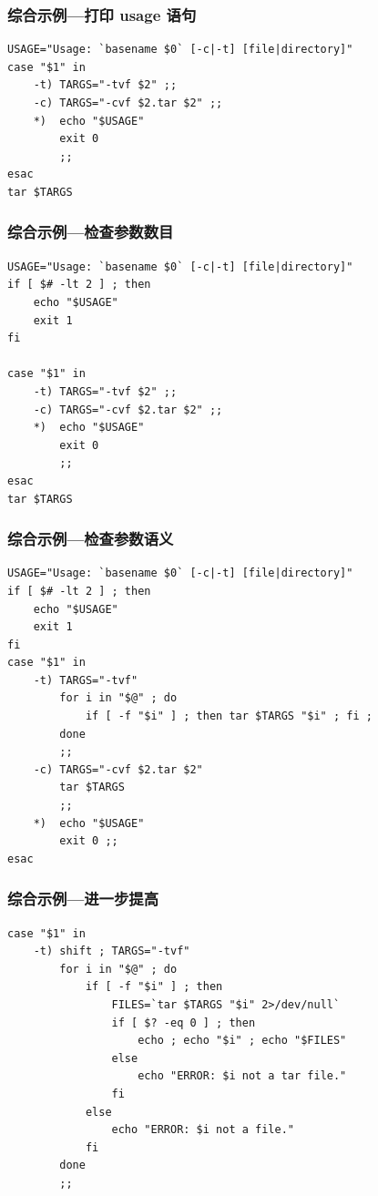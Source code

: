 \documentclass[compress]{beamer}
\begin{document}
\begin{frame}[fragile]
\frametitle{综合示例---打印 usage 语句}

\begin{lstlisting}
USAGE="Usage: `basename $0` [-c|-t] [file|directory]"
case "$1" in
    -t) TARGS="-tvf $2" ;;
    -c) TARGS="-cvf $2.tar $2" ;;
    *)  echo "$USAGE"
        exit 0
        ;;
esac
tar $TARGS
\end{lstlisting}
\end{frame}

\begin{frame}[fragile]
\frametitle{综合示例---检查参数数目}

\begin{lstlisting}
USAGE="Usage: `basename $0` [-c|-t] [file|directory]"
if [ $# -lt 2 ] ; then
    echo "$USAGE"
    exit 1
fi

case "$1" in
    -t) TARGS="-tvf $2" ;;
    -c) TARGS="-cvf $2.tar $2" ;;
    *)  echo "$USAGE"
        exit 0
        ;;
esac
tar $TARGS
\end{lstlisting}
\end{frame}

\begin{frame}[fragile]
\frametitle{综合示例---检查参数语义}
\begin{lstlisting}[lineskip=-0.01pt]
USAGE="Usage: `basename $0` [-c|-t] [file|directory]"
if [ $# -lt 2 ] ; then
    echo "$USAGE"
    exit 1
fi
case "$1" in
    -t) TARGS="-tvf"
        for i in "$@" ; do
            if [ -f "$i" ] ; then tar $TARGS "$i" ; fi ;
        done
        ;;
    -c) TARGS="-cvf $2.tar $2"
        tar $TARGS
        ;;
    *)  echo "$USAGE"
        exit 0 ;;
esac
\end{lstlisting}
\end{frame}

\begin{frame}[fragile]
\frametitle{综合示例---进一步提高}
\begin{lstlisting}[lineskip=-0.01pt]
case "$1" in
    -t) shift ; TARGS="-tvf"
        for i in "$@" ; do
            if [ -f "$i" ] ; then
                FILES=`tar $TARGS "$i" 2>/dev/null`
                if [ $? -eq 0 ] ; then
                    echo ; echo "$i" ; echo "$FILES"
                else
                    echo "ERROR: $i not a tar file."
                fi
            else
                echo "ERROR: $i not a file."
            fi
        done
        ;;
\end{lstlisting}
\end{frame}
\end{document}

